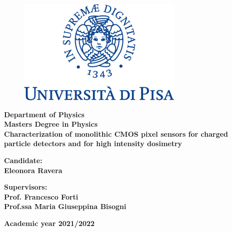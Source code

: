 \thispagestyle{empty} 
\begin{figure}
    \vspace{10mm}
    \centering
    \includegraphics[keepaspectratio=true,scale=.8]{figures/Logo-UNIPisa.png}
\end{figure}

\begin{center}
    \large{\textbf{Department of Physics\\Masters Degree in Physics}}\\
\vspace{15mm}\hspace{15mm}
    \LARGE{\bf{Characterization of monolithic CMOS pixel sensors for charged particle detectors and for high intensity dosimetry }}
\end{center}
\vspace{40mm}
\begin{minipage}[t]{0.39\textwidth}
\large{\bf Candidate:\\Eleonora Ravera}
\end{minipage}
\hfill
\begin{minipage}[t]{0.55\textwidth}
\raggedleft
\large{\bf\bf Supervisors:\\Prof. Francesco Forti\\Prof.ssa Maria Giuseppina Bisogni}\\
\end{minipage}
\vspace{45mm}
\begin{center}
    \large{\bf{Academic year 2021/2022}}
\end{center}
